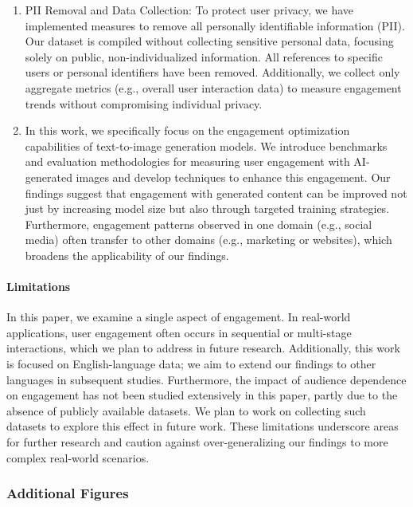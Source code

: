 \begin{enumerate}
\item PII Removal and Data Collection: To protect user privacy, we have implemented measures to remove all personally identifiable information (PII). Our dataset is compiled without collecting sensitive personal data, focusing solely on public, non-individualized information. All references to specific users or personal identifiers have been removed. Additionally, we collect only aggregate metrics (e.g., overall user interaction data) to measure engagement trends without compromising individual privacy.

\item In this work, we specifically focus on the engagement optimization capabilities of text-to-image generation models. We introduce benchmarks and evaluation methodologies for measuring user engagement with AI-generated images and develop techniques to enhance this engagement. Our findings suggest that engagement with generated content can be improved not just by increasing model size but also through targeted training strategies. Furthermore, engagement patterns observed in one domain (e.g., social media) often transfer to other domains (e.g., marketing or websites), which broadens the applicability of our findings.


\end{enumerate}

\paragraph{Limitations} In this paper, we examine a single aspect of engagement. In real-world applications, user engagement often occurs in sequential or multi-stage interactions, which we plan to address in future research. Additionally, this work is focused on English-language data; we aim to extend our findings to other languages in subsequent studies. Furthermore, the impact of audience dependence on engagement has not been studied extensively in this paper, partly due to the absence of publicly available datasets. We plan to work on collecting such datasets to explore this effect in future work. These limitations underscore areas for further research and caution against over-generalizing our findings to more complex real-world scenarios.



\subsubsection{Additional Figures}

